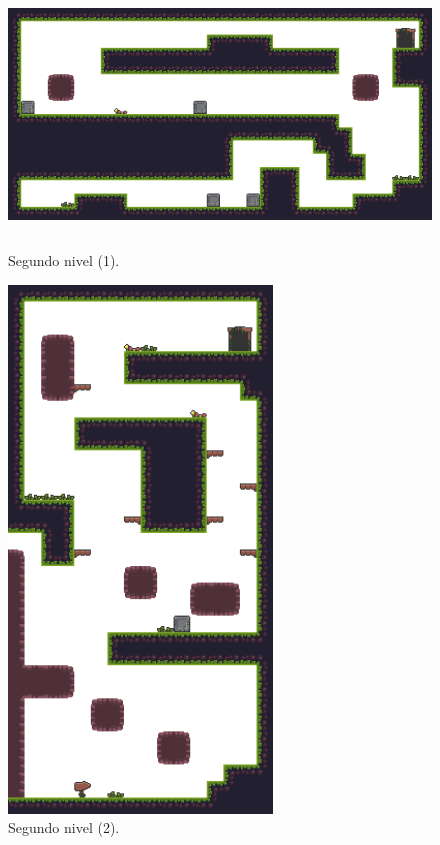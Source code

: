 \begin{figure}[h]
	\centering
	\includegraphics[height=7cm]{capitulos/apendice/level_2_0.png}
	\caption{Segundo nivel (1).}\label{fig:ap_lvl_2_0}
\end{figure}

\begin{figure}[h]
	\centering
	\includegraphics[height=14cm]{capitulos/apendice/level_2_1.png}
	\caption{Segundo nivel (2).}\label{fig:ap_lvl_2_1}
\end{figure}

